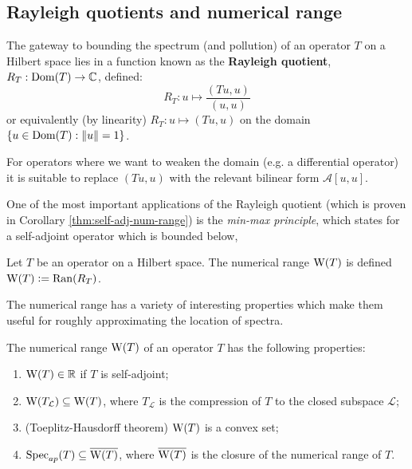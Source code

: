 \documentclass[../main.tex]{subfiles}
\begin{document}
\subsection{Rayleigh quotients and numerical range}\label{sec:num-range}
The gateway to bounding the spectrum (and pollution) of an operator $T$ on a
Hilbert space lies in a function known as the \textbf{Rayleigh
quotient}, $R_T: \mathrm{Dom}(T) \rightarrow \mathbb{C}$,
defined:
\begin{equation*}
  R_T: u \mapsto \frac{( Tu, u )}{(u, u)}
\end{equation*} 
or equivalently (by linearity) $R_T: u \mapsto (Tu, u)$ on the domain $\{u \in
\mathrm{Dom}(T) : \|u\| = 1\}$.
 
For operators where we want to weaken the domain (e.g. a differential operator)
it is suitable to replace $(Tu, u)$ with the relevant bilinear form
$\mathcal{A}[u, u].$

One of the most important applications of the Rayleigh quotient (which is proven
in Corollary \ref{thm:self-adj-num-range}) is the \emph{min-max principle}, which
states for a self-adjoint operator which is bounded below,

\begin{definition}
  Let $T$ be an operator on a Hilbert space. The
  numerical range $\mathrm{W}(T)$ is defined $\mathrm{W}(T) \mathrel{\mathop:}= \mathrm{Ran}(R_T)$.
\end{definition}

The numerical range has a variety of interesting properties which make them
useful for roughly approximating the location of spectra.

\begin{proposition}
\label{thm:num-range-props}
  The numerical range $\mathrm{W}(T)$ of an operator $T$ has the following properties:
  \begin{enumerate}
    \item
    \label{item:num-in-R}
	$\mathrm{W}(T) \in \mathbb{R}$ if $T$ is self-adjoint;
    \item
    \label{item:proj-num-range} 
	$\mathrm{W}(T_\mathcal{L}) \subseteq \mathrm{W}(T)$, where $T_\mathcal{L}$ is the compression of $T$ to the closed subspace $\mathcal{L}$;
    \item (Toeplitz-Hausdorff theorem)
    \label{item:toeplitz-hausdorff}
      $\mathrm{W}(T)$ is a convex set;
    \item
    \label{item:spec-in-num} 
      $\mathrm{Spec}_{ap}(T) \subseteq \overline{\mathrm{W}(T)}$,
     where $\overline{\mathrm{W}(T)}$ is the closure of the numerical range of $T$.
  \end{enumerate}
\end{proposition}
\end{document}

